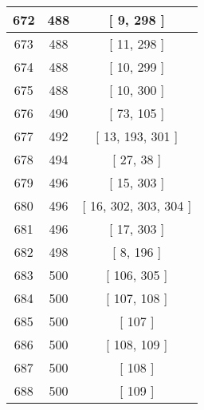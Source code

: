 \begin{center}
\begin{longtable}[H]{|| c c c ||}
\hline
672 & 488 & [ 9, 298 ] \\ 
\hline
673 & 488 & [ 11, 298 ] \\ 
\hline
674 & 488 & [ 10, 299 ] \\ 
\hline
675 & 488 & [ 10, 300 ] \\ 
\hline
676 & 490 & [ 73, 105 ] \\ 
\hline
677 & 492 & [ 13, 193, 301 ] \\ 
\hline
678 & 494 & [ 27, 38 ] \\ 
\hline
679 & 496 & [ 15, 303 ] \\ 
\hline
680 & 496 & [ 16, 302, 303, 304 ] \\ 
\hline
681 & 496 & [ 17, 303 ] \\ 
\hline
682 & 498 & [ 8, 196 ] \\ 
\hline
683 & 500 & [ 106, 305 ] \\ 
\hline
684 & 500 & [ 107, 108 ] \\ 
\hline
685 & 500 & [ 107 ] \\ 
\hline
686 & 500 & [ 108, 109 ] \\ 
\hline
687 & 500 & [ 108 ] \\ 
\hline
688 & 500 & [ 109 ] \\ 
\hline
\end{longtable}
\end{center}
